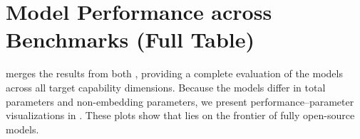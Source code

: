 \section[Model Perf. across Benchmarks (Full)]{Model Performance across Benchmarks (Full Table)}
\label{sec:model_perf_full}

 merges the results from both , providing a complete evaluation of the models across all target capability dimensions. Because the models differ in total parameters and non-embedding parameters, we present performance–parameter visualizations in . These plots show that \sys lies on the frontier of fully open-source models.

\begin{landscape}
\begin{table}[p]
\centering
\caption{Comparison of Model Performance across Various Benchmarks.}
\label{tab:model_comparison_full}
\resizebox{\linewidth}{!}{%

}
\end{table}
\end{landscape}

